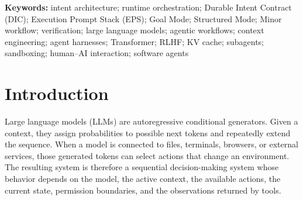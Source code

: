 \documentclass[11pt,a4paper]{article}
\begin{document}
\begin{abstract}
The proposed architecture is intended to exchange additional model-side computation and structured artifacts for lower human coordination effort, better intent fidelity, and stronger evidence preservation. It does not guarantee lower aggregate token use, latency, monetary cost, or error rate. Its economic case depends on the value of human time, the cost of inference and tooling, the task distribution, and the capability of the models available. The current 5.6 release is tuned to GPT-5.6-era and comparable agent systems; it uses full self-contained prompt templates, explicit low/mid/high/xhigh/ultra execution guides, and capability-based routing so smaller models can execute mechanical work without inheriting strategic authority. Older systems may require simpler tasks and tighter supervision, while later systems may make parts of the scaffolding unnecessary or require different controls. The paper concludes with a proportional operating protocol and experiments for measuring quality, safety, context use, cost, and recovery behavior.
\end{abstract}

\noindent\textbf{Keywords:} intent architecture; runtime orchestration; Durable Intent Contract (DIC); Execution Prompt Stack (EPS); Goal Mode; Structured Mode; Minor workflow; verification; large language models; agentic workflows; context engineering; agent harnesses; Transformer; RLHF; KV cache; subagents; sandboxing; human--AI interaction; software agents

\newpage
\setcounter{tocdepth}{2}
\tableofcontents
\newpage

\section{Introduction}\label{sec:introduction}

Large language models (LLMs) are autoregressive conditional generators. Given a context, they assign probabilities to possible next tokens and repeatedly extend the sequence. When a model is connected to files, terminals, browsers, or external services, those generated tokens can select actions that change an environment. The resulting system is therefore a sequential decision-making system whose behavior depends on the model, the active context, the available actions, the current state, permission boundaries, and the observations returned by tools.
\end{document}

